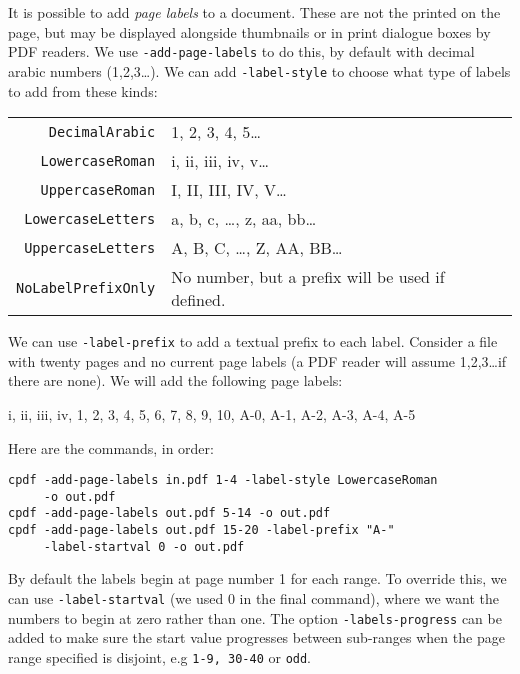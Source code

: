 \documentclass{book}
\begin{document}
It is possible to add \textit{page labels} to a document. These are not the printed on the page, but may be displayed alongside thumbnails or in print dialogue boxes by PDF readers. We use \texttt{-add-page-labels} to do this, by default with decimal arabic numbers (1,2,3\ldots). We can add \texttt{-label-style} to choose what type of labels to add from these kinds:

\vspace{4mm}
{\small\begin{tabular}{rl}
  \texttt{DecimalArabic} & 1, 2, 3, 4, 5\ldots \\
  \texttt{LowercaseRoman} & i, ii, iii, iv, v\ldots \\
  \texttt{UppercaseRoman} & I, II, III, IV, V\ldots \\
  \texttt{LowercaseLetters} & a, b, c, \ldots , z, aa, bb\ldots \\
  \texttt{UppercaseLetters} & A, B, C, \ldots , Z, AA, BB\ldots \\
  \texttt{NoLabelPrefixOnly} & No number, but a prefix will be used if defined.
\end{tabular}}
\vspace{4mm}

\noindent We can use \texttt{-label-prefix} to add a textual prefix to each label. 
Consider a file with twenty pages and no current page labels (a PDF reader will assume 1,2,3\ldots if there are none). We will add the following page labels:

\vspace{4mm}
i, ii, iii, iv, 1, 2, 3, 4, 5, 6, 7, 8, 9, 10, A-0, A-1, A-2, A-3, A-4, A-5
\vspace{4mm}

\noindent Here are the commands, in order:

{\small\begin{framed}
  \noindent\verb!cpdf -add-page-labels in.pdf 1-4 -label-style LowercaseRoman!\\
  \noindent\verb!     -o out.pdf!\\
  
  \noindent\verb!cpdf -add-page-labels out.pdf 5-14 -o out.pdf!\\

  \noindent\verb!cpdf -add-page-labels out.pdf 15-20 -label-prefix "A-"!\\
  \noindent\verb!     -label-startval 0 -o out.pdf!
\end{framed}}

\noindent By default the labels begin at page number 1 for each range. To override this, we can use \texttt{-label-startval} (we used $0$ in the final command), where we want the numbers to begin at zero rather than one. The option \texttt{-labels-progress} can be added to make sure the  start value progresses between sub-ranges when the page range specified is disjoint, e.g \texttt{1-9, 30-40} or \texttt{odd}.
\end{document}
